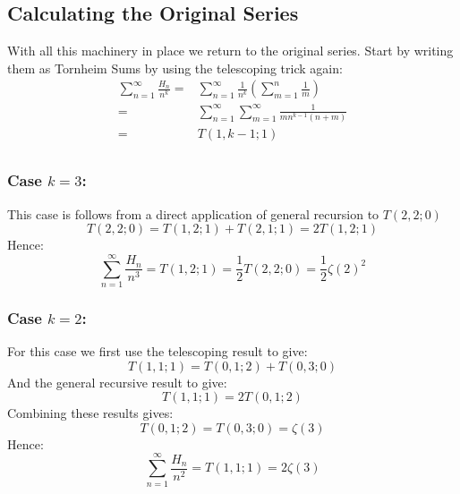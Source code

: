 \subsection{Calculating the Original Series}
With all this machinery in place we return to the original series.
Start by writing them as Tornheim Sums by using the telescoping trick again:
\begin{equation*}
\begin{aligned}
	\sum_{n=1}^\infty\frac{H_n}{n^k} =& \sum_{n=1}^\infty\frac{1}{n^k}\left(\sum_{m=1}^{n}\frac{1}{m}\right)\\
	=& \sum_{n=1}^\infty\sum_{m=1}^\infty\frac{1}{mn^{k-1}(n+m)}\\
	=& T(1,k-1;1)\\
\end{aligned}
\end{equation*}

\subsubsection{Case $k=3$:}
This case is follows from a direct application of general recursion to $T(2,2;0)$
\[T(2,2;0) = T(1,2;1)+T(2,1;1) = 2T(1,2;1)\]
Hence:
\[\sum_{n=1}^\infty\frac{H_n}{n^3} = T(1,2;1) = \frac{1}{2}T(2,2;0) = \frac{1}{2}\zeta(2)^2\]

\subsubsection{Case $k=2$:}
For this case we first use the telescoping result to give:
\[T(1,1;1) = T(0,1;2)+T(0,3;0)\]
And the general recursive result to give:
\[T(1,1;1) = 2T(0,1;2)\]
Combining these results gives:
\[T(0,1;2) = T(0,3;0) = \zeta(3)\]
Hence:
\[\sum_{n=1}^\infty\frac{H_n}{n^2} = T(1,1;1) = 2\zeta(3)\]
